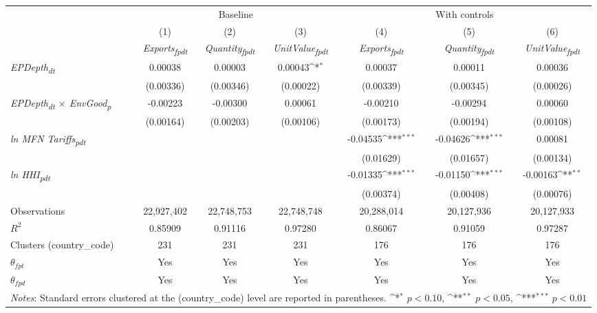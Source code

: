 {
\def\sym#1{\ifmmode^{#1}\else\(^{#1}\)\fi}
\begin{tabular}{l*{6}{c}}
\toprule
&\multicolumn{3}{c}{Baseline}&\multicolumn{3}{c}{With controls}\\\cmidrule(lr){2-4}\cmidrule(lr){5-7}
&(1)&(2)&(3)&(4)&(5)&(6)\\
&\textit{Exports\textsubscript{fpdt}}&\textit{Quantity\textsubscript{fpdt}}&\textit{UnitValue\textsubscript{fpdt}}&\textit{Exports\textsubscript{fpdt}}&\textit{Quantity\textsubscript{fpdt}}&\textit{UnitValue\textsubscript{fpdt}}\\
\midrule
\textit{EPDepth\textsubscript{dt}} & 0.00038 & 0.00003 & 0.00043\sym{*} & 0.00037 & 0.00011 & 0.00036\\
 & (0.00336) & (0.00346) & (0.00022) & (0.00339) & (0.00345) & (0.00026)\\
\addlinespace
\textit{EPDepth\textsubscript{dt} $\times$ EnvGood\textsubscript{p}} & -0.00223 & -0.00300 & 0.00061 & -0.00210 & -0.00294 & 0.00060\\
 & (0.00164) & (0.00203) & (0.00106) & (0.00173) & (0.00194) & (0.00108)\\
\addlinespace
\textit{ln MFN Tariffs\textsubscript{pdt}} &  &  &  & -0.04535\sym{***} & -0.04626\sym{***} & 0.00081\\
 &  &  &  & (0.01629) & (0.01657) & (0.00134)\\
\addlinespace
\textit{ln HHI\textsubscript{pdt}} &  &  &  & -0.01335\sym{***} & -0.01150\sym{***} & -0.00163\sym{**}\\
 &  &  &  & (0.00374) & (0.00408) & (0.00076)\\
\midrule
Observations & 22,927,402 & 22,748,753 & 22,748,748 & 20,288,014 & 20,127,936 & 20,127,933\\
$R^{2}$ & 0.85909 & 0.91116 & 0.97280 & 0.86067 & 0.91059 & 0.97287\\
Clusters (country_code) & 231 & 231 & 231 & 176 & 176 & 176\\
$\theta_{fpt}$ & Yes & Yes & Yes & Yes & Yes & Yes\\
$\theta_{fpd}$ & Yes & Yes & Yes & Yes & Yes & Yes\\
\bottomrule
\multicolumn{7}{l}{\footnotesize \textit{Notes}: Standard errors clustered at the (country_code) level are reported in parentheses. \sym{*} \(p<0.10\), \sym{**} \(p<0.05\), \sym{***} \(p<0.01\)}\\
\end{tabular}
}
